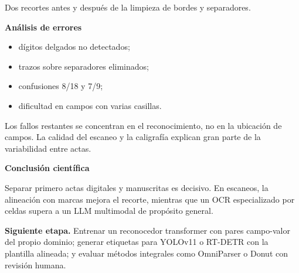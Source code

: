 \documentclass[portrait,final,a0paper,fontscale=0.284]{baposter}
\newcommand{\compresslist}{%
  \setlength{\itemsep}{2pt}%
  \setlength{\parskip}{0pt}%
  \setlength{\parsep}{0pt}%
}
\begin{document}
\begin{poster}
{\begin{minipage}[t]{0.26\linewidth}
    \scriptsize\textcolor{muted}{Dos recortes antes y después de la limpieza de
    bordes y separadores.}
  \end{minipage}\hfill
  \begin{minipage}[t]{0.34\linewidth}
    \vspace{0pt}
    \textbf{Análisis de errores}
    \begin{itemize}\compresslist
      \item dígitos delgados no detectados;
      \item trazos sobre separadores eliminados;
      \item confusiones 8/18 y 7/9;
      \item dificultad en campos con varias casillas.
    \end{itemize}
    Los fallos restantes se concentran en el reconocimiento, no en la ubicación
    de campos. La calidad del escaneo y la caligrafía explican gran parte de la
    variabilidad entre actas.
  \end{minipage}\hfill
  \begin{minipage}[t]{0.36\linewidth}
    \vspace{0pt}
    \textbf{Conclusión científica}

    Separar primero actas digitales y manuscritas es decisivo. En escaneos, la
    alineación con marcas mejora el recorte, mientras que un OCR especializado
    por celdas supera a un LLM multimodal de propósito general.

    \textbf{Siguiente etapa.} Entrenar un reconocedor transformer con pares
    campo-valor del propio dominio; generar etiquetas para YOLOv11 o RT-DETR con
    la plantilla alineada; y evaluar métodos integrales como OmniParser o Donut
    con revisión humana.
  \end{minipage}
}

\end{poster}
\end{document}
